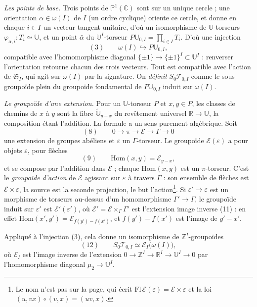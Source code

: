 \documentclass[11pt,a4paper]{article}
\begin{document}
\emph{Les points de base.} Trois points de $\mathbb{P}^1(\mathbb{C})$ sont sur
un unique cercle ; une orientation $\alpha \in \omega(I)$ de $I$ (un ordre
cyclique) oriente ce cercle, et donne en chaque $i \in I$ un vecteur tangent
unitaire, d'où un isomorphisme de $\mathbb{U}$-torseurs $\varphi_{\alpha,i} :
T_i \simeq \mathbb{U}$, et un point $\bar\alpha$ du $\mathbb{U}^I$-torseur
$P\mathbb{U}_{0,I} = \prod_{i \in I} T_i$. D'où une injection
\[
(3)\qquad \omega(I) \hookrightarrow P\mathbb{U}_{0,I},
\]
compatible avec l'homomorphisme diagonal $\{\pm 1\} \to \{\pm1\}^I \subset
\mathbb{U}^I$ : renverser l'orientation retourne chacun des trois vecteurs.
Tout est compatible avec l'action de $\mathfrak{S}_I$, qui agit sur
$\omega(I)$ par la signature. On \emph{définit} $S_0\mathcal{T}_{0,I}$ comme le
sous-groupoïde plein du groupoïde fondamental de $P\mathbb{U}_{0,I}$ induit sur
$\omega(I)$.

\emph{Le groupoïde d'une extension.} Pour un $\mathbb{U}$-torseur $P$ et $x, y
\in P$, les classes de chemins de $x$ à $y$ sont la fibre
$\widetilde{\mathbb{U}}_{y-x}$ du revêtement universel $\mathbb{R} \to
\mathbb{U}$, la composition étant l'addition. La formule a un sens purement
algébrique. Soit
\[
(8)\qquad 0 \to \pi \to \mathcal{E} \to \Gamma \to 0
\]
une extension de groupes abéliens et $\varepsilon$ un $\Gamma$-torseur. Le
groupoïde $\mathcal{E}(\varepsilon)$ a pour objets $\varepsilon$, pour flèches
\[
(9)\qquad \mathrm{Hom}(x, y) = \mathcal{E}_{y-x},
\]
et se compose par l'addition dans $\mathcal{E}$ ; chaque
$\mathrm{Hom}(x,y)$ est un $\pi$-torseur. C'est le \emph{groupoïde d'action}
de $\mathcal{E}$ agissant sur $\varepsilon$ à travers $\Gamma$ : son ensemble de
flèches est $\mathcal{E} \times \varepsilon$, la source est la seconde
projection, le but l'action\footnote{Le nom n'est pas sur la page, qui écrit
$\mathrm{Fl}\,\mathcal{E}(\varepsilon) = \mathcal{E} \times \varepsilon$ et la
loi $(u, vx) \circ (v, x) = (uv, x)$.}. Si $\varepsilon' \to \varepsilon$ est un
morphisme de torseurs au-dessus d'un homomorphisme $\Gamma' \to \Gamma$, le
groupoïde induit sur $\varepsilon'$ est $\mathcal{E}'(\varepsilon')$, où
$\mathcal{E}' = \mathcal{E} \times_{\Gamma} \Gamma'$ est l'extension image
inverse (11) : en effet $\mathrm{Hom}(x', y') = \mathcal{E}_{f(y')-f(x')}$, et
$f(y') - f(x')$ est l'image de $y' - x'$.

Appliqué à l'injection (3), cela donne un isomorphisme de
$\mathbb{Z}^I$-groupoïdes
\[
(12)\qquad S_0\mathcal{T}_{0,I} \simeq \mathcal{E}_I\bigl(\omega(I)\bigr),
\]
où $\mathcal{E}_I$ est l'image inverse de l'extension $0 \to \mathbb{Z}^I \to
\mathbb{R}^I \to \mathbb{U}^I \to 0$ par l'homomorphisme diagonal $\mu_2 \to
\mathbb{U}^I$.
\end{document}
